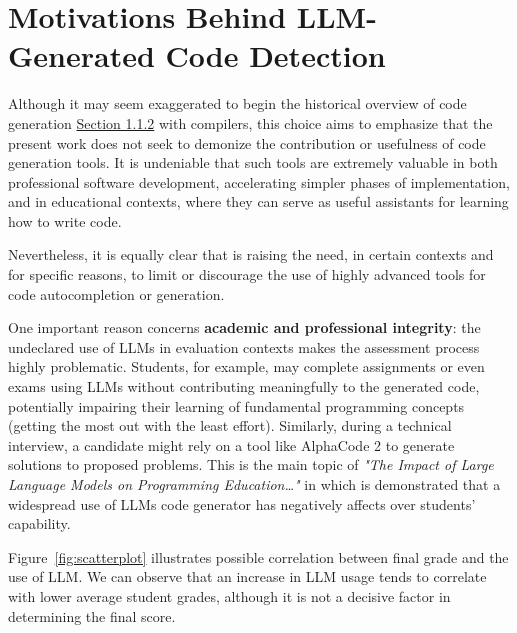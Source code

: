 \clearpage
\section{Motivations Behind LLM-Generated Code Detection}
Although it may seem exaggerated to begin the historical 
overview of code generation 
\hyperref[sec:Code_Generator]{Section 1.1.2} with compilers, 
this choice aims to emphasize that the present work does not 
seek to demonize the contribution or usefulness of code 
generation tools. It is undeniable that such tools are 
extremely valuable in both professional software development, 
accelerating simpler phases of implementation, and 
in educational contexts, where they can serve as 
useful assistants for learning how to write code.

Nevertheless, it is equally clear that is raising 
the need, in certain contexts 
and for specific reasons, to limit or discourage 
the use of highly advanced tools for code autocompletion 
or generation.

\vspace{1\baselineskip}
\noindent

One important reason concerns \textbf{academic and 
professional integrity}: the undeclared use of 
LLMs in evaluation contexts makes the assessment 
process highly problematic. Students, for example, 
may complete assignments or even exams using LLMs 
without contributing meaningfully to the generated 
code, potentially impairing their learning of 
fundamental programming concepts 
(getting the most out with the least effort). Similarly, 
during a technical interview, a candidate might 
rely on a tool like AlphaCode 2 to generate solutions 
to proposed problems.
This is the main topic of
\textit{"The Impact of Large Language Models on 
Programming Education…"} \cite{Jost2024LLM}
in which is demonstrated that a widespread use of 
LLMs code generator has negatively affects 
over students' capability.

Figure~\ref{fig:scatterplot} illustrates 
possible correlation between final grade and the
use of LLM. We can observe that an increase 
in LLM usage tends to correlate with lower 
average student grades, although it is not a 
decisive factor in determining the final score.


